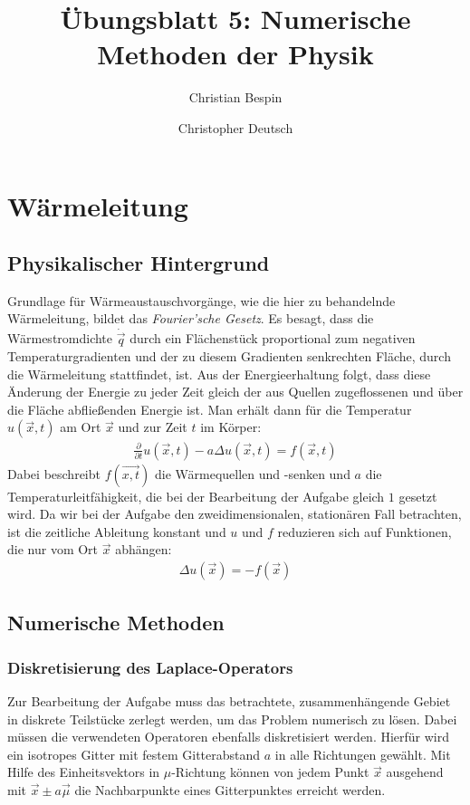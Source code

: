 \documentclass[10pt,a4paper]{article}
\author{Christian Bespin \and Christopher Deutsch}
\title{Übungsblatt 5: Numerische Methoden der Physik}
\begin{document}
\maketitle

\setcounter{section}{4}

\section{Wärmeleitung}

\subsection{Physikalischer Hintergrund}
Grundlage für Wärmeaustauschvorgänge, wie die hier zu behandelnde Wärmeleitung, bildet das \emph{Fourier'sche Gesetz}. Es besagt, dass die Wärmestromdichte $\dot{\vec{q}}$ durch ein Flächenstück proportional zum negativen Temperaturgradienten und der zu diesem Gradienten senkrechten Fläche, durch die Wärmeleitung stattfindet, ist. Aus der Energieerhaltung folgt, dass diese Änderung der Energie zu jeder Zeit gleich der aus Quellen zugeflossenen und über die Fläche abfließenden Energie ist. Man erhält dann für die Temperatur $u(\vec{x},t)$ am Ort $\vec{x}$ und zur Zeit $t$ im Körper:
\begin{align}  
\frac{\partial}{\partial t}u(\vec{x},t)-a \Delta u(\vec{x},t)=f(\vec{x},t)
\end{align}
Dabei beschreibt $f(\vec{x,t})$ die Wärmequellen und -senken und $a$ die Temperaturleitfähigkeit, die bei der Bearbeitung der Aufgabe gleich $1$ gesetzt wird. Da wir bei der Aufgabe den zweidimensionalen, stationären Fall betrachten, ist die zeitliche Ableitung konstant und $u$ und $f$ reduzieren sich auf Funktionen, die nur vom Ort $\vec{x}$ abhängen:
\begin{align}
\Delta u(\vec{x})=-f(\vec{x})
\label{eqn:dgl}
\end{align}

\subsection{Numerische Methoden}
\subsubsection{Diskretisierung des Laplace-Operators}
Zur Bearbeitung der Aufgabe muss das betrachtete, zusammenhängende Gebiet in diskrete Teilstücke zerlegt werden, um das Problem numerisch zu lösen. Dabei müssen die verwendeten Operatoren ebenfalls diskretisiert werden. Hierfür wird ein isotropes Gitter mit festem Gitterabstand $a$ in alle Richtungen gewählt. Mit Hilfe des Einheitsvektors in $\mu$-Richtung können von jedem Punkt $\vec{x}$ ausgehend mit $\vec{x} \pm a\vec{\mu}$ die Nachbarpunkte eines Gitterpunktes erreicht werden.
\end{document}
